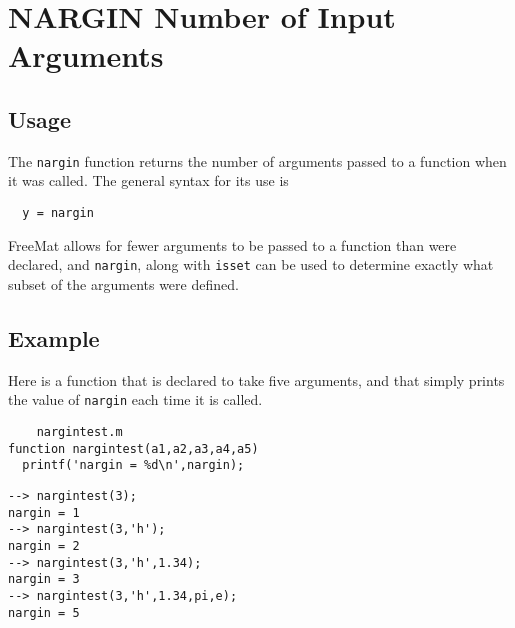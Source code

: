 \section{NARGIN Number of Input Arguments}

\subsection{Usage}

The \verb|nargin| function returns the number of arguments passed
to a function when it was called.  The general syntax for its
use is
\begin{verbatim}
  y = nargin
\end{verbatim}
FreeMat allows for
fewer arguments to be passed to a function than were declared,
and \verb|nargin|, along with \verb|isset| can be used to determine
exactly what subset of the arguments were defined.
\subsection{Example}

Here is a function that is declared to take five 
arguments, and that simply prints the value of \verb|nargin|
each time it is called.
\begin{verbatim}
    nargintest.m
function nargintest(a1,a2,a3,a4,a5)
  printf('nargin = %d\n',nargin);
\end{verbatim}
\begin{verbatim}
--> nargintest(3);
nargin = 1
--> nargintest(3,'h');
nargin = 2
--> nargintest(3,'h',1.34);
nargin = 3
--> nargintest(3,'h',1.34,pi,e);
nargin = 5
\end{verbatim}
